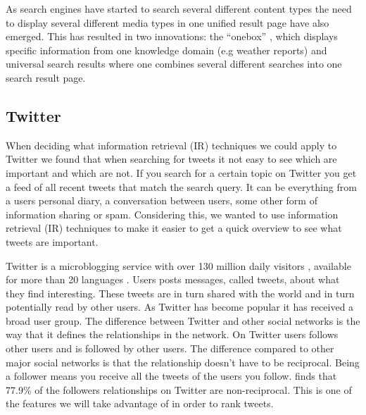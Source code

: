 As search engines have started to search several different content types the need to display several different media types in one unified result page have also emerged. This has resulted in two innovations: the “onebox” \citep{Baeza-Yates2011}, which displays specific information from one knowledge domain (e.g weather reports) and universal search results where one combines several different searches into one search result page.

\subsection{Twitter}
\label{Twitter}
When deciding what information retrieval (IR) techniques we could apply to Twitter we found that when searching for tweets it not easy to see which are important and which are not. If you search for a certain topic on Twitter you get a feed of all recent tweets that match the search query. It can be everything from a users personal diary, a conversation between users, some other form of information sharing or spam. Considering this, we wanted to use information retrieval (IR) techniques to make it easier to get a quick overview to see what tweets are important. 

Twitter is a microblogging service with over 130 million daily visitors \citep{WolframAlpha}, available for more than 20 languages \citep{Twitter2012}. Users posts messages, called tweets, about what they find interesting. These tweets are in turn shared with the world and in turn potentially read by other users. As Twitter has become popular it has received a broad user group. The difference between Twitter and other social networks is the way that it defines the relationships in the network. On Twitter users follows other users and is followed by other users. The difference compared to other major social networks is that the relationship doesn't have to be reciprocal. Being a follower means you receive all the tweets of the users you follow. \citep{Kwak2010} finds that 77.9\% of the followers relationships on Twitter are non-reciprocal. This is one of the features we will take advantage of in order to rank tweets. 


